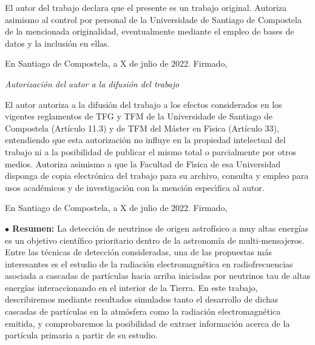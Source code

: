 \documentclass[11 pt, a4paper]{article} %
\numberwithin{equation}{section}
\numberwithin{figure}{section}
\numberwithin{table}{section}
\begin{document}
	El autor del trabajo declara que el presente es un trabajo original. Autoriza asimismo al control por personal de la Universidade de Santiago de Compostela de la mencionada originalidad, eventualmente mediante el empleo de bases de datos y la inclusi\'on en ellas.
	
	En Santiago de Compostela, a X de julio de 2022. Firmado,\vspace{3cm}
	
	
	{\sl Autorizaci\'on del autor a la difusi\'on del trabajo}
	
	 El autor autoriza a la difusi\'on del trabajo a los efectos considerados en los vigentes reglamentos de TFG y TFM de la Universidade de Santiago de Compostela (Artículo 11.3) y de TFM del M\'aster en F\'{\i}sica (Artículo 33), entendiendo que esta autorizaci\'on no influye en la propiedad intelectual del trabajo ni a la posibilidad de publicar el mismo total o parcialmente por otros medios. Autoriza asimismo a que la Facultad de F\'{\i}sica de esa Universidad disponga de copia electr\'onica del trabajo para su archivo, consulta y empleo para usos acad\'emicos y de investigaci\'on con la menci\'on espec\'{\i}fica al autor. 
	
	En Santiago de Compostela, a X de julio de 2022. Firmado,\
	
	\thispagestyle{empty}
	\pagebreak

	\thispagestyle{empty} %
	\pagebreak
	
		\begin{flushleft}  {\bf $\bullet$ Resumen:\;\;}
		La detección de neutrinos de origen astrofísico a muy altas energías es un objetivo científico prioritario dentro de la astronomía de multi-mensajeros. Entre las técnicas de detección consideradas, una de las propuestas más interesantes es el estudio de la radiación electromagnética en radiofrecuencias asociada a cascadas de partículas hacia arriba iniciadas por neutrinos tau de altas energías interaccionando en el interior de la Tierra. En este trabajo, describiremos mediante resultados simulados tanto el desarrollo de dichas cascadas de partículas en la atmósfera como la radiación electromagnética emitida, y comprobaremos la posibilidad de extraer información acerca de la partícula primaria a partir de su estudio.
	\end{flushleft}\mbox{}
\end{document}
